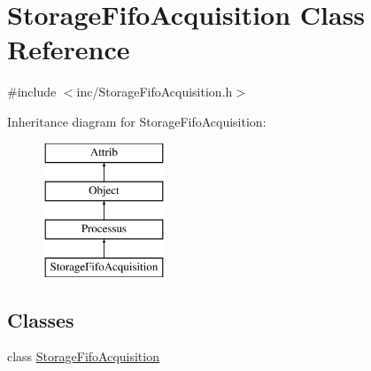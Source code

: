 \hypertarget{classStorageFifoAcquisition}{}\section{Storage\+Fifo\+Acquisition Class Reference}
\label{classStorageFifoAcquisition}


{\ttfamily \#include $<$inc/\+Storage\+Fifo\+Acquisition.\+h$>$}

Inheritance diagram for Storage\+Fifo\+Acquisition\+:\begin{figure}[H]
\begin{center}
\leavevmode
\includegraphics[height=4.000000cm]{classStorageFifoAcquisition}
\end{center}
\end{figure}
\subsection*{Classes}
\begin{DoxyCompactItemize}
\item 
class \hyperlink{classStorageFifoAcquisition_1_1StorageFifoAcquisition}{Storage\+Fifo\+Acquisition}
\end{DoxyCompactItemize}
